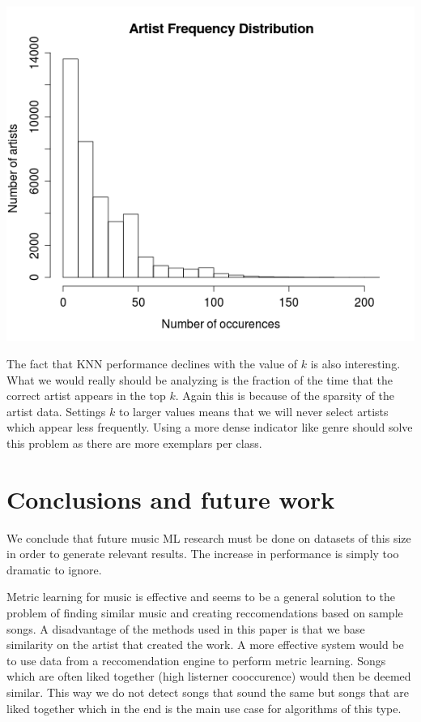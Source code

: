 \documentclass[a4paper,10pt]{article}
\begin{document}
\begin{center}
 \includegraphics[scale=0.4,keepaspectratio=true]{./artist_frequency_dist.png}
\end{center}

The fact that KNN performance declines with the value of $k$ is also interesting. What we would really should be analyzing is the fraction of the time that the correct artist appears in the top $k$. Again this is because of the sparsity of the artist data. Settings $k$ to larger values means that we will never select artists which appear less frequently. Using a more dense indicator like genre should solve this problem as there are more exemplars per class.

\section{Conclusions and future work}
We conclude that future music ML research must be done on datasets of this size in order to generate relevant results. The increase in performance is simply too dramatic to ignore.

Metric learning for music is effective and seems to be a general solution to the problem of finding similar music and creating reccomendations based on sample songs. A disadvantage of the methods used in this paper is that we base similarity on the artist that created the work. A more effective system would be to use data from a reccomendation engine to perform metric learning. Songs which are often liked together (high listerner cooccurence) would then be deemed similar. This way we do not detect songs that sound the same but songs that are liked together which in the end is the main use case for algorithms of this type. 
{}
\end{document}
